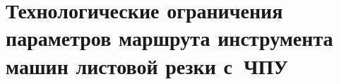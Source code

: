 
\section{
  Технологические ограничения параметров маршрута инструмента
  машин листовой резки с~ЧПУ
}
\label{sect:1.3}
\setcounter{equation}{0}




